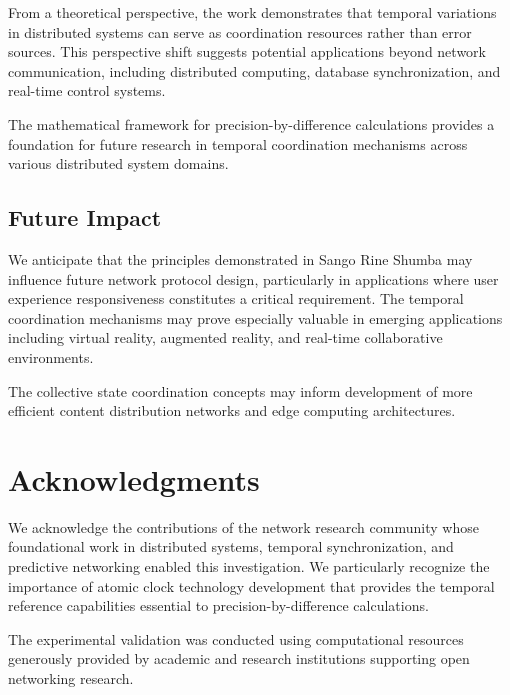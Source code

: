 \documentclass[12pt,a4paper]{article}
\begin{document}
From a theoretical perspective, the work demonstrates that temporal variations in distributed systems can serve as coordination resources rather than error sources. This perspective shift suggests potential applications beyond network communication, including distributed computing, database synchronization, and real-time control systems.

The mathematical framework for precision-by-difference calculations provides a foundation for future research in temporal coordination mechanisms across various distributed system domains.

\subsection{Future Impact}

We anticipate that the principles demonstrated in Sango Rine Shumba may influence future network protocol design, particularly in applications where user experience responsiveness constitutes a critical requirement. The temporal coordination mechanisms may prove especially valuable in emerging applications including virtual reality, augmented reality, and real-time collaborative environments.

The collective state coordination concepts may inform development of more efficient content distribution networks and edge computing architectures.

\section*{Acknowledgments}

We acknowledge the contributions of the network research community whose foundational work in distributed systems, temporal synchronization, and predictive networking enabled this investigation. We particularly recognize the importance of atomic clock technology development that provides the temporal reference capabilities essential to precision-by-difference calculations.

The experimental validation was conducted using computational resources generously provided by academic and research institutions supporting open networking research.
\end{document}
